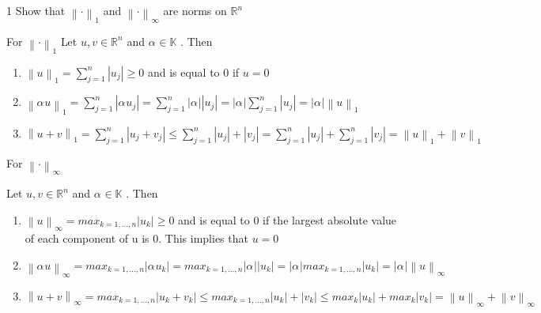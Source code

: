 \documentclass[a4paper,norsk]{article}
\renewcommand{\geq}{\geqslant}
\renewcommand{\leq}{\leqslant}
\begin{document}
\begin{oppgavebox}{1}{}
Show that $ \left\lVert \cdot \right\rVert _1 $ and $ \left\lVert \cdot   \right\rVert_{\infty}  $ are norms on $ \mathbb{R} ^{n}  $

\begin{proofbox}{For $ \left\lVert \cdot \right\rVert _1 $ }{}
  Let $ u, v \in \mathbb{R} ^{n}  $ and $ \alpha_{}^{} \in \mathbb{K} $ . Then
  \begin{enumerate}
    \item $ \left\lVert u \right\rVert _1 = \sum_{ j= 1}^{ n } \left| u_j \right| \geq 0 $ and is equal to 0 if $ u=0 $ 
    \item $ \left\lVert \alpha_{}^{} u   \right\rVert_1 = \sum_{ j=1 }^{ n } \left| \alpha_{}^{} u_j \right| = \sum_{ j=1 }^{ n } \left| \alpha_{}^{}  \right| \left| u_j \right|  = \left| \alpha_{}^{}  \right| \sum_{ j=1 }^{ n } \left| u_j \right| = \left| \alpha_{}^{}  \right| \left\lVert u \right\rVert _1      $ 
    \item $ \left\lVert u + v \right\rVert _1 = \sum_{ j=1 }^{ n } \left| u_j + v_j \right| \leq \sum_{ j=1 }^{ n } \left| u_j \right| + \left| v_j \right| = \sum_{ j=1 }^{ n } \left| u_j \right| + \sum_{ j=1 }^{ n } \left| v_j \right| = \left\lVert u \right\rVert _1 + \left\lVert v \right\rVert _1      $ 
  \end{enumerate}
\end{proofbox}

\begin{proofbox}{For $ \left\lVert \cdot \right\rVert _{\infty} $ }{}
  
  Let $ u, v \in \mathbb{R} ^{n}  $ and $ \alpha_{}^{} \in \mathbb{K} $ . Then
  \begin{enumerate}
    \item $ \left\lVert u \right\rVert _{\infty} = max_{k=1, ..., n} \left| u_k \right| \geq 0  $ and is equal to 0 if the largest absolute value of each component of u is 0. This implies that $ u= 0 $ 
    \item $ \left\lVert \alpha_{}^{} u   \right\rVert_{\infty} = max_{k=1, ..., n} \left| \alpha_{}^{} u_k \right| = max_{k=1, ..., n} \left| \alpha_{}^{}  \right| \left| u_k \right|  = \left| \alpha_{}^{}  \right| max_{k=1, ..., n} \left| u_k \right| = \left| \alpha_{}^{}  \right| \left\lVert u \right\rVert _{\infty}       $ 
    \item $ \left\lVert u + v \right\rVert _{\infty} = max_{k=1, ..., n} \left| u_k + v_k \right| \leq max_{k= 1, ..., n} \left| u_k \right| + \left| v_k \right| \leq max_{k} \left| u_k \right| + max_k \left| v_k \right| = \left\lVert u \right\rVert _{\infty} + \left\lVert v \right\rVert _{\infty}    $ 
  \end{enumerate}
\end{proofbox}
\end{oppgavebox}
\end{document}
